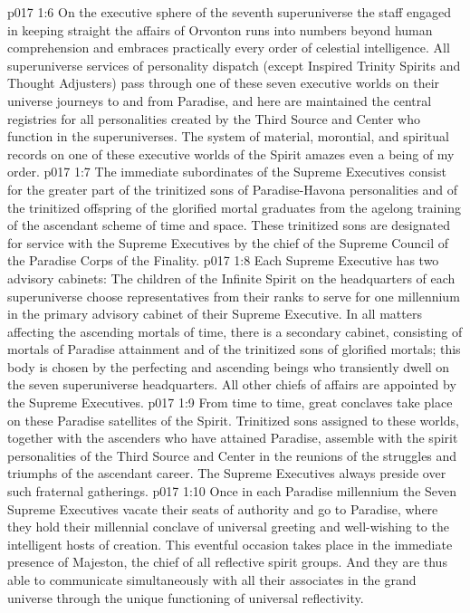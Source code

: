 \vs p017 1:6 On the executive sphere of the seventh superuniverse the staff engaged in keeping straight the affairs of Orvonton runs into numbers beyond human comprehension and embraces practically every order of celestial intelligence. All superuniverse services of personality dispatch (except Inspired Trinity Spirits and Thought Adjusters) pass through one of these seven executive worlds on their universe journeys to and from Paradise, and here are maintained the central registries for all personalities created by the Third Source and Center who function in the superuniverses. The system of material, morontial, and spiritual records on one of these executive worlds of the Spirit amazes even a being of my order.
\vs p017 1:7 The immediate subordinates of the Supreme Executives consist for the greater part of the trinitized sons of Paradise\hyp{}Havona personalities and of the trinitized offspring of the glorified mortal graduates from the agelong training of the ascendant scheme of time and space. These trinitized sons are designated for service with the Supreme Executives by the chief of the Supreme Council of the Paradise Corps of the Finality.
\vs p017 1:8 Each Supreme Executive has two advisory cabinets: The children of the Infinite Spirit on the headquarters of each superuniverse choose representatives from their ranks to serve for one millennium in the primary advisory cabinet of their Supreme Executive. In all matters affecting the ascending mortals of time, there is a secondary cabinet, consisting of mortals of Paradise attainment and of the trinitized sons of glorified mortals; this body is chosen by the perfecting and ascending beings who transiently dwell on the seven superuniverse headquarters. All other chiefs of affairs are appointed by the Supreme Executives.
\pc \vs p017 1:9 From time to time, great conclaves take place on these Paradise satellites of the Spirit. Trinitized sons assigned to these worlds, together with the ascenders who have attained Paradise, assemble with the spirit personalities of the Third Source and Center in the reunions of the struggles and triumphs of the ascendant career. The Supreme Executives always preside over such fraternal gatherings.
\vs p017 1:10 Once in each Paradise millennium the Seven Supreme Executives vacate their seats of authority and go to Paradise, where they hold their millennial conclave of universal greeting and well\hyp{}wishing to the intelligent hosts of creation. This eventful occasion takes place in the immediate presence of Majeston, the chief of all reflective spirit groups. And they are thus able to communicate simultaneously with all their associates in the grand universe through the unique functioning of universal reflectivity.
